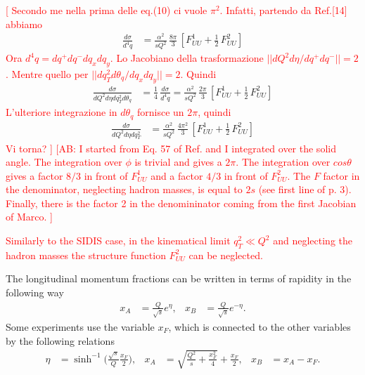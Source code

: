 \documentclass[aps,preprintnumbers,showpacs,nofootinbib,superscriptaddress,floatfix]{revtex4}
\begin{document}
\textcolor{red}{[ Secondo me nella prima delle eq.(10) ci vuole $\pi^2$. Infatti, partendo da Ref.[14] abbiamo}
\begin{align}
\frac{d\sigma}{d^4q} &= \frac{\alpha^2}{s Q^2}\, \frac{8 \pi}{3} \, \left[ F_{UU}^1 + \frac{1}{2}\, F_{UU}^2 \right] 
\nonumber
\end{align}
\textcolor{red}{Ora $d^4 q = dq^+ dq^- dq_x dq_y$. Lo Jacobiano della trasformazione $|| dQ^2 d\eta / dq^+ dq^- || = 2$. Mentre quello per $||dq_T^2 d\theta_q / dq_x dq_y|| = 2$. Quindi }
\begin{align}
\frac{d\sigma}{dQ^2 d\eta dq_T^2 d\theta_q} &= \frac{1}{4} \, \frac{d\sigma}{d^4q} = \frac{\alpha^2}{s Q^2}\, \frac{2 \pi}{3} \, \left[ F_{UU}^1 + \frac{1}{2}\, F_{UU}^2 \right] 
\nonumber
\end{align}
\textcolor{red}{L'ulteriore integrazione in $d\theta_q$ fornisce un $2\pi$, quindi}
\begin{align}
\frac{d\sigma}{dQ^2 d\eta dq_T^2} &= \frac{\alpha^2}{s Q^2}\, \frac{4 \pi^2}{3} \, \left[ F_{UU}^1 + \frac{1}{2}\, F_{UU}^2 \right] 
\nonumber
\end{align}
\textcolor{red}{Vi torna? ]
\textcolor{red}[AB: I started from Eq. 57 of Ref. \cite{Arnold:2008kf} and I
integrated over the solid angle. The integration over $\phi$ is trivial and
gives a $2 \pi$. The
integration over $cos\theta$ gives a factor $8/3$ in front of $F_{UU}^1$
 and a factor $4/3$ in front of $F_{UU}^2$. The $F$ factor in the
 denominator, neglecting hadron masses, is equal to $2s$ (see first line of p.
 3). Finally, there is the factor 2 in the denomininator coming from the first
 Jacobian of Marco. ]}

\textcolor{red}{Similarly to the SIDIS case, in the kinematical limit $q_T^2 \ll Q^2$ and neglecting the hadron masses the structure function $F_{UU}^2$ can be neglected.}

The longitudinal momentum fractions can be written in terms of
rapidity in the following way 
\begin{align}
x_A &= \frac{Q}{\sqrt{s}} e^{\eta},
&
x_B &= \frac{Q}{\sqrt{s}} e^{-\eta}.
\label{xab}
\end{align} 
Some experiments use the variable $x_F$, which is connected to the other
variables  by the following relations
\begin{align}
\label{e:eta_xf}
\eta &= \sinh^{-1}\bigg(\frac{\sqrt{s}}{Q}\frac{x_F}{2}\bigg),
& 
x_{A} &= \sqrt{\frac{Q^2}{s} + \frac{x_F^2}{4}} + \frac{x_F}{2},
&
x_B &= x_A - x_F.  
\end{align} 
\end{document}
